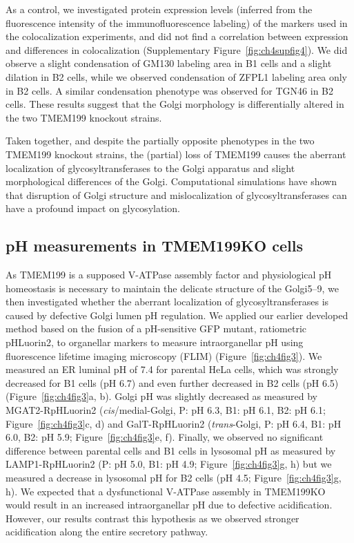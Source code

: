 As a control, we investigated protein expression levels (inferred from the fluorescence intensity of the immunofluorescence labeling) of the markers used in the colocalization experiments, and did not find a correlation between expression and differences in colocalization (Supplementary Figure~\ref{fig:ch4supfig4}). We did observe a slight condensation of GM130 labeling area in B1 cells and a slight dilation in B2 cells, while we observed condensation of ZFPL1 labeling area only in B2 cells. A similar condensation phenotype was observed for TGN46 in B2 cells. These results suggest that the Golgi morphology is differentially altered in the two TMEM199 knockout strains.

Taken together, and despite the partially opposite phenotypes in the two TMEM199 knockout strains, the (partial) loss of TMEM199 causes the aberrant localization of glycosyltransferases to the Golgi apparatus and slight morphological differences of the Golgi. Computational simulations have shown that disruption of Golgi structure and mislocalization of glycosyltransferases can have a profound impact on glycosylation\cite{jaiman_golgi_2020}.

\subsection{pH measurements in TMEM199KO cells}

As TMEM199 is a supposed V-ATPase assembly factor and physiological pH homeostasis is necessary to maintain the delicate structure of the Golgi5–9, we then investigated whether the aberrant localization of glycosyltransferases is caused by defective Golgi lumen pH regulation. We applied our earlier developed method based on the fusion of a pH-sensitive GFP mutant, ratiometric pHLuorin2\cite{mahon_phluorin2:_2011,miesenbock_visualizing_1998}, to organellar markers to measure intraorganellar pH using fluorescence lifetime imaging microscopy (FLIM)\cite{linders_fluorescence_2021} (Figure~\ref{fig:ch4fig3}). We measured an ER luminal pH of 7.4 for parental HeLa cells, which was strongly decreased for B1 cells (pH 6.7) and even further decreased in B2 cells (pH 6.5) (Figure~\ref{fig:ch4fig3}a, b). Golgi pH was slightly decreased as measured by MGAT2-RpHLuorin2 (\emph{cis}/medial-Golgi, P: pH 6.3, B1: pH 6.1, B2: pH 6.1; Figure~\ref{fig:ch4fig3}c, d) and GalT-RpHLuorin2 (\emph{trans}-Golgi, P: pH 6.4, B1: pH 6.0, B2: pH 5.9; Figure~\ref{fig:ch4fig3}e, f). Finally, we observed no significant difference between parental cells and B1 cells in lysosomal pH as measured by LAMP1-RpHLuorin2 (P: pH 5.0, B1: pH 4.9; Figure~\ref{fig:ch4fig3}g, h) but we measured a decrease in lysosomal pH for B2 cells (pH 4.5; Figure~\ref{fig:ch4fig3}g, h). We expected that a dysfunctional V-ATPase assembly in TMEM199KO would result in an increased intraorganellar pH due to defective acidification. However, our results contrast this hypothesis as we observed stronger acidification along the entire secretory pathway.

